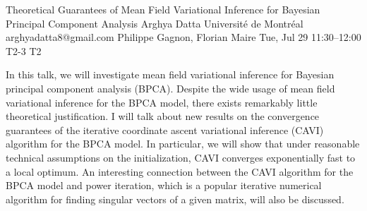 \begin{talk}
  {Theoretical Guarantees of Mean Field Variational Inference for Bayesian Principal Component Analysis}%
  {Arghya Datta}%
  {Université de Montréal}%
  {arghyadatta8@gmail.com}%
  {Philippe Gagnon, Florian Maire}%
  {}%
  {Tue, Jul 29 11:30–12:00}%
  {T2-3}%
  {T2}%
  
				
			
In this talk, we will investigate mean field variational inference for Bayesian principal component analysis (BPCA). Despite the wide usage of mean field variational inference for the BPCA model, there exists remarkably little theoretical justification. I will talk about new results on the convergence guarantees of the iterative coordinate ascent variational inference (CAVI) algorithm for the BPCA model. In particular, we will show that under reasonable technical assumptions on the initialization, CAVI converges exponentially fast to a local optimum. An interesting connection between the CAVI algorithm for the BPCA model and power iteration, which is a popular iterative numerical algorithm for finding singular vectors of a given matrix, will also be discussed.


\end{talk}

